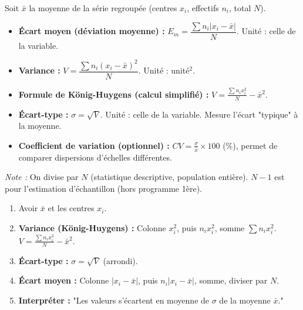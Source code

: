 \documentclass[11pt]{article}
\begin{document}
\begin{definition}
Soit $\bar{x}$ la moyenne de la série regroupée (centres $x_i$, effectifs $n_i$, total $N$).
\begin{itemize}
    \item \textbf{Écart moyen (déviation moyenne) :} $E_m = \dfrac{\sum n_i |x_i - \bar{x}|}{N}$. Unité : celle de la variable.
    \item \textbf{Variance :} $V = \dfrac{\sum n_i (x_i - \bar{x})^2}{N}$. Unité : unité$^2$.
    \item \textbf{Formule de König-Huygens (calcul simplifié) :} $\boxed{V = \frac{\sum n_i x_i^2}{N} - \bar{x}^2}$.
    \item \textbf{Écart-type :} $\boxed{\sigma = \sqrt{V}}$. Unité : celle de la variable. Mesure l'écart "typique" à la moyenne.
    \item \textbf{Coefficient de variation (optionnel) :} $CV = \frac{\sigma}{\bar{x}} \times 100$ (\%), permet de comparer dispersions d'échelles différentes.
\end{itemize}
\emph{Note :} On divise par $N$ (statistique descriptive, population entière). $N-1$ est pour l'estimation d'échantillon (hors programme 1ère).
\end{definition}

\begin{methode}
\begin{enumerate}
    \item Avoir $\bar{x}$ et les centres $x_i$.
    \item \textbf{Variance (König-Huygens) :} Colonne $x_i^2$, puis $n_i x_i^2$, somme $\sum n_i x_i^2$. $V = \frac{\sum n_i x_i^2}{N} - \bar{x}^2$.
    \item \textbf{Écart-type :} $\sigma = \sqrt{V}$ (arrondi).
    \item \textbf{Écart moyen :} Colonne $|x_i - \bar{x}|$, puis $n_i |x_i - \bar{x}|$, somme, diviser par $N$.
    \item \textbf{Interpréter :} "Les valeurs s'écartent en moyenne de $\sigma$ de la moyenne $\bar{x}$."
\end{enumerate}
\end{methode}
\end{document}
